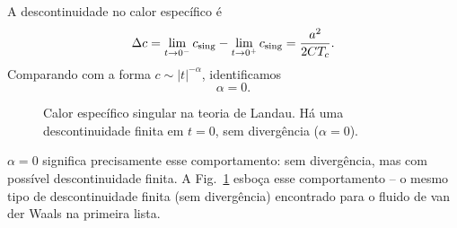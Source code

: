\documentclass[11pt,a4paper]{article}
\begin{document}
%
A descontinuidade no calor específico é
%
\begin{equation}
    \Delta c = \lim_{t \to 0^-} c_{\rm sing} - \lim_{t \to 0^+} c_{\rm sing} = \frac{a^2}{2C T_c}.
\end{equation}
%
Comparando com a forma $c \sim |t|^{-\alpha}$, identificamos
%
\begin{equation}
    \boxed{\alpha = 0}.
\end{equation}
%
\begin{figure}[h]
\centering
{}
\caption{Calor específico singular na teoria de Landau. Há uma descontinuidade finita em $t = 0$, sem divergência ($\alpha = 0$).}
\label{fig:landau_cv}
\end{figure}
%
$\alpha=0$ significa precisamente esse comportamento: sem divergência, mas com possível descontinuidade finita. A Fig.~\ref{fig:landau_cv} esboça esse comportamento -- o mesmo tipo de descontinuidade finita (sem divergência) encontrado para o fluido de van der Waals na primeira lista.
%
\end{document}
